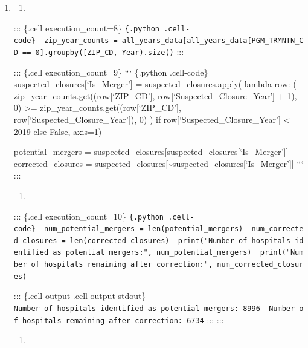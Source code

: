 \documentclass[
  letterpaper,
  DIV=11,
  numbers=noendperiod]{scrartcl}
\providecommand{\tightlist}{%
  \setlength{\itemsep}{0pt}\setlength{\parskip}{0pt}}\usepackage{longtable,booktabs,array}
\begin{document}
\begin{enumerate}
\def\labelenumi{\arabic{enumi}.}
\setcounter{enumi}{2}
\item
  \begin{enumerate}
  \def\labelenumii{\alph{enumii}.}
  \tightlist
  \item
  \end{enumerate}

  ::: \{.cell execution\_count=8\}
  \texttt{\{.python\ .cell-code\}\ \ zip\_year\_counts\ =\ all\_years\_data{[}all\_years\_data{[}\textquotesingle{}PGM\_TRMNTN\_CD\textquotesingle{}{]}\ ==\ 0{]}.groupby({[}\textquotesingle{}ZIP\_CD\textquotesingle{},\ \textquotesingle{}Year\textquotesingle{}{]}).size()}
  :::

  ::: \{.cell execution\_count=9\} ``` \{.python .cell-code\}
  suspected\_closures{[}`Is\_Merger'{]} = suspected\_closures.apply(
  lambda row: ( zip\_year\_counts.get((row{[}`ZIP\_CD'{]},
  row{[}`Suspected\_Closure\_Year'{]} + 1), 0) \textgreater=
  zip\_year\_counts.get((row{[}`ZIP\_CD'{]},
  row{[}`Suspected\_Closure\_Year'{]}), 0) ) if
  row{[}`Suspected\_Closure\_Year'{]} \textless{} 2019 else False,
  axis=1)

  potential\_mergers =
  suspected\_closures{[}suspected\_closures{[}`Is\_Merger'{]}{]}
  corrected\_closures =
  suspected\_closures{[}\textasciitilde suspected\_closures{[}`Is\_Merger'{]}{]}
  ``` :::

  \begin{enumerate}
  \def\labelenumii{\alph{enumii}.}
  \setcounter{enumii}{1}
  \tightlist
  \item
  \end{enumerate}

  ::: \{.cell execution\_count=10\}
  \texttt{\{.python\ .cell-code\}\ \ num\_potential\_mergers\ =\ len(potential\_mergers)\ \ num\_corrected\_closures\ =\ len(corrected\_closures)\ \ print("Number\ of\ hospitals\ identified\ as\ potential\ mergers:",\ num\_potential\_mergers)\ \ print("Number\ of\ hospitals\ remaining\ after\ correction:",\ num\_corrected\_closures)}

  ::: \{.cell-output .cell-output-stdout\}
  \texttt{Number\ of\ hospitals\ identified\ as\ potential\ mergers:\ 8996\ \ Number\ of\ hospitals\ remaining\ after\ correction:\ 6734}
  ::: :::

  \begin{enumerate}
  \def\labelenumii{\alph{enumii}.}
  \setcounter{enumii}{2}
  \tightlist
  \item
  \end{enumerate}


\end{enumerate}
\end{document}
